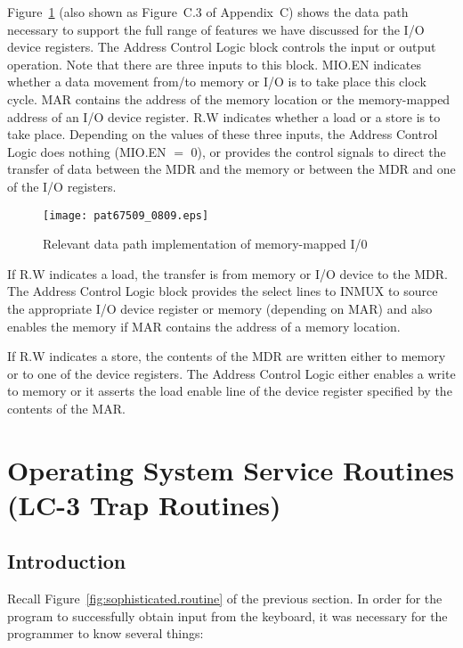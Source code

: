\documentclass{patt}
\begin{document}
Figure~\ref{fig:memmap.io} (also shown as Figure~C.3 of Appendix~C)
shows the data path necessary to support the full range of features we
have discussed for the I/O device registers.  The Address Control
Logic block controls the input or output operation.  Note that there
are three inputs to this block.  MIO.EN indicates whether a data
movement from/to memory or I/O is to take place this clock cycle.  
MAR contains the address of the memory location or the memory-mapped
address of an I/O device register.  R.W indicates whether a load or a
store is to take place.  Depending on the values of these three
inputs, the Address Control Logic does nothing (MIO.EN $=$ 0), or
provides the control signals to direct the transfer of data between
the MDR and the memory or between the MDR and one of the I/O registers.

\begin{figure}[h!]
\centerline{\texttt{[image: pat67509\_0809.eps]}}
\caption{Relevant data path implementation of memory-mapped I/0}
\label{fig:memmap.io}
\end{figure}

If R.W indicates a load, the transfer is from memory or I/O device to
the MDR.  The Address Control Logic block provides the select lines to
INMUX to source the appropriate I/O device register or memory
(depending on MAR) and also enables the memory if MAR contains the
address of a memory location.

If R.W indicates a store, the contents of the MDR are written either
to memory or to one of the device registers.  The Address Control
Logic either enables a write to memory or it asserts the load enable
line of the device register specified by the contents of the MAR.

\FloatBarrier
\section{Operating System Service Routines (LC-3 Trap Routines)}

\subsection{Introduction}

Recall Figure~\ref{fig:sophisticated.routine} of the previous section.
In order for the program to successfully obtain input from the
keyboard, it was necessary for the programmer to know several things:
\end{document}
